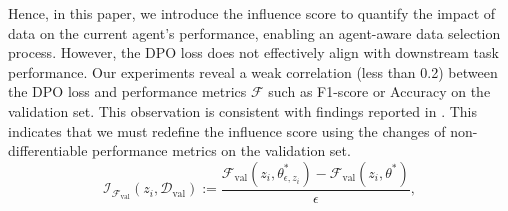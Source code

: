 
Hence, in this paper, we introduce the influence score to quantify the impact of data on the current agent's performance, enabling an agent-aware data selection process. However, the DPO loss does not effectively align with downstream task performance. Our experiments reveal a weak correlation (less than 0.2) between the DPO loss and performance metrics $\mathcal{F}$ such as F1-score or Accuracy on the validation set. This observation is consistent with findings reported in \citet{DBLP:journals/corr/abs-2406-02900, DBLP:journals/corr/abs-2410-11677}. This indicates that we must redefine the influence score using the changes of non-differentiable performance metrics on the validation set.
\begin{equation}
\mathcal{I}_{\mathcal{F}_{\text{val}}}(z_i, \mathcal{D}_{\text{val}}) := \frac{\mathcal{F}_{\text{val}}(z_i, \theta_{\epsilon,z_i}^*) - \mathcal{F}_{\text{val}}(z_i, \theta^*)}{\epsilon},
\end{equation}

